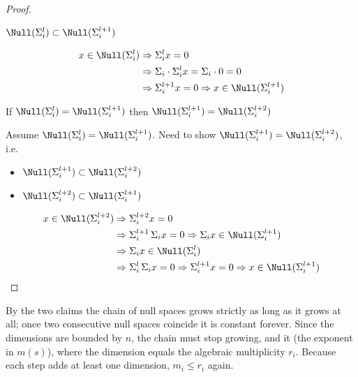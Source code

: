 \begin{proof}
\begin{claim}
$\Null(\Sigma_i^l)\subset\Null(\Sigma_i^{l+1})$
\end{claim}
\begin{minipage}{0.3\textwidth}
\centering
{}
\end{minipage}\hfill
\begin{minipage}{0.65\textwidth}
\begin{align*}
x\in\Null(\Sigma_i^l)&\Rightarrow \Sigma_i^lx=0\\
&\Rightarrow \Sigma_i\cdot\Sigma_i^lx=\Sigma_i\cdot 0=0\\
&\Rightarrow \Sigma_i^{l+1}x=0\Rightarrow x\in\Null(\Sigma_i^{l+1})
\end{align*}
\end{minipage}

\begin{claim}
If $\Null(\Sigma_i^l)=\Null(\Sigma_i^{l+1})$ then $\Null(\Sigma_i^{l+1})=\Null(\Sigma_i^{l+2})$
\end{claim}
Assume $\Null(\Sigma_i^l)=\Null(\Sigma_i^{l+1})$. Need to show $\Null(\Sigma_i^{l+1})=\Null(\Sigma_i^{l+2})$, i.e.
\begin{itemize}[itemsep=2pt,topsep=2pt]
\item[$\checkmark$] $\Null(\Sigma_i^{l+1})\subset\Null(\Sigma_i^{l+2})$
\item[] $\Null(\Sigma_i^{l+2})\subset\Null(\Sigma_i^{l+1})$
\end{itemize}
\begin{align*}
x\in\Null(\Sigma_i^{l+2})&\Rightarrow\Sigma_i^{l+2}x=0\\
&\Rightarrow \Sigma_i^{l+1}\,\Sigma_ix=0\Rightarrow\Sigma_ix\in\Null(\Sigma_i^{l+1})\\
&\Rightarrow\Sigma_ix\in\Null(\Sigma_i^l)\\
&\Rightarrow \Sigma_i^l\,\Sigma_ix=0\Rightarrow\Sigma_i^{l+1}x=0\Rightarrow x\in\Null(\Sigma_i^{l+1}) \qedhere
\end{align*}
\end{proof}
\begin{insight}[Consequence]
By the two claims the chain of null spaces grows strictly as long as it grows at all; once two consecutive null spaces coincide it is constant forever. Since the dimensions are bounded by $n$, the chain must stop growing, and it  (the exponent in $m(s)$), where the dimension equals the algebraic multiplicity $r_i$. Because each step adds at least one dimension, $m_i\le r_i$ again.
\end{insight}

